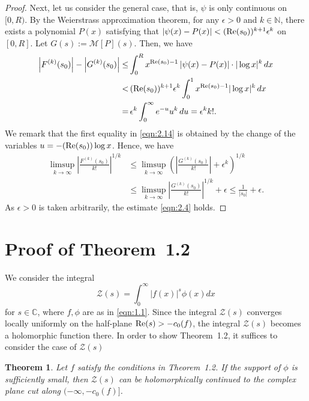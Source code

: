 \documentclass[12pt]{amsart}
\numberwithin{equation}{section}
\newtheorem{theorem}{Theorem}[section]
\theoremstyle{definition}
\theoremstyle{remark}
\newcommand{\C}{{\mathbb C}}
\newcommand{\N}{{\mathbb N}}
\newcommand{\1}{{\bf 1}}
\begin{document}
\begin{proof}
Next, 
let us consider the general case, that is, 
$\psi$ is only continuous on $[0,R)$.
By the Weierstrass approximation theorem,
for any $\epsilon>0$ and $k \in \N$,
there exists a polynomial $P(x)$ 
satisfying that 
$|\psi(x) - P(x)| < ({\rm Re}(s_0))^{k+1}\epsilon^k$ 
on $[0,R]$.
Let $G(s):={\mathcal M}[P](s)$. 
Then, 
we have
\begin{equation}\label{eqn:2.14}
\begin{split}
\left|F^{(k)}(s_0)\right| - \left|G^{(k)}(s_0)\right|  
\le& \int_0^R x^{{\rm Re}(s_0)-1}
\left|\psi(x) - P(x)\right|\cdot|\log x|^k\,dx \\
<& \,({\rm Re}(s_0))^{k+1}\epsilon^k
\int_0^{1} x^{{\rm Re}(s_0)-1}|\log x|^k\,dx\\
=& \,\epsilon^k\int_0^{\infty}e^{-u} u^k \,du
=\epsilon^k k!.
\end{split}
\end{equation}
We remark that
the first equality in 
\eqref{eqn:2.14} is obtained 
by the change of the variables 
$u=-({\rm Re}(s_0))\log x$.
Hence, we have 
\begin{equation*}
\begin{split}
\limsup_{k \to \infty}
\left| \frac{F^{(k)}(s_0)}{k!} \right|^{1/k} 
&\le \limsup_{k \to \infty}
\left(\left| \frac{G^{(k)}(s_0)}{k!}\right| 
+\epsilon^{k}\right)^{1/k}\\
&\le \limsup_{k \to \infty}
\left| \frac{G^{(k)}(s_0)}{k!} \right|^{1/k} 
+ \epsilon
\leq \frac{1}{|s_0|} + \epsilon.
\end{split}
\end{equation*}
As $\epsilon>0$ is taken arbitrarily, 
the estimate \eqref{eqn:2.4} holds.
\end{proof}


\section{Proof of Theorem~1.2}

We consider the integral
\begin{equation}\label{eqn:3.1}
{\mathcal Z}(s)=\int_{0}^{\infty}|f(x)|^s \phi(x)dx
\end{equation}
for $s\in\C$,  
where $f, \phi$ are as in \eqref{eqn:1.1}.
Since the integral ${\mathcal Z}(s)$ converges 
locally uniformly on the half-plane ${\rm Re}(s)>-c_{0}(f)$,
the integral ${\mathcal Z}(s)$ becomes 
a holomorphic function there.
In order to show Theorem~1.2, 
it suffices to consider the case of 
$\mathcal{Z}(s)$
\begin{theorem}\label{thm:3.1}
Let $f$ satisfy the conditions in Theorem~1.2.
If the support of $\phi$ is sufficiently small,
then
$\mathcal{Z}(s)$ can be holomorphically continued
to the complex plane cut along $(-\infty,-c_0(f)]$.
\end{theorem}
\end{document}
